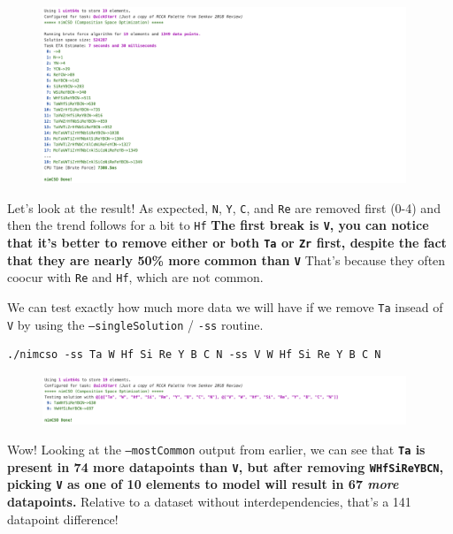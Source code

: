 \begin{figure}[H]
  \centering
  \includegraphics[width=0.97\textwidth]{nimcsotutorial/4.png}
\end{figure}

Let's look at the result! As expected, \texttt{N},
\texttt{Y}, \texttt{C}, and
\texttt{Re} are removed first (0-4) and then the trend
follows for a bit to \texttt{Hf} \textbf{The first
break is \texttt{V}, you can notice that it's better to
remove either or both \texttt{Ta} or
\texttt{Zr} first, despite the fact that they are
nearly 50\% more common than \texttt{V}} That's
because they often coocur with \texttt{Re} and
\texttt{Hf}, which are not common.

We can test exactly how much more data we will have if we remove
\texttt{Ta} insead of \texttt{V} by
using the \texttt{--singleSolution} /
\texttt{-ss} routine.

\begin{verbatim}
./nimcso -ss Ta W Hf Si Re Y B C N -ss V W Hf Si Re Y B C N
\end{verbatim}

\begin{figure}[H]
  \centering
  \includegraphics[width=0.97\textwidth]{nimcsotutorial/5.png}
\end{figure}

Wow! Looking at the \texttt{--mostCommon} output from
earlier, we can see that \textbf{\texttt{Ta} is present
in 74 more datapoints than \texttt{V}, but after
removing \texttt{WHfSiReYBCN}, picking
\texttt{V} as one of 10 elements to model will result
in 67 \emph{more} datapoints.} Relative to a dataset without
interdependencies, that's a 141 datapoint difference!

